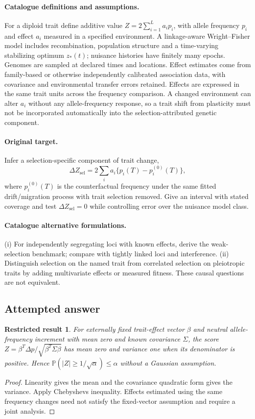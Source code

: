 \documentclass[11pt]{article}
\newcommand{\Prob}{\mathbb P}
\providecommand{\Prob}{\mathbb P}
\newtheorem{attemptresult}{Restricted result}[section]
\begin{document}
\paragraph{Catalogue definitions and assumptions.}
For a diploid trait define additive value $Z=2\sum_{i=1}^L a_i p_i$, with allele frequency $p_i$ and effect $a_i$ measured in a specified environment. A linkage-aware Wright--Fisher model includes recombination, population structure and a time-varying stabilizing optimum $z_*(t)$; nuisance histories have finitely many epochs. Genomes are sampled at declared times and locations. Effect estimates come from family-based or otherwise independently calibrated association data, with covariance and environmental transfer errors retained. Effects are expressed in the same trait units across the frequency comparison. A changed environment can alter $a_i$ without any allele-frequency response, so a trait shift from plasticity must not be incorporated automatically into the selection-attributed genetic component.
\paragraph{Original target.}
Infer a selection-specific component of trait change,
\[
 \Delta Z_{\mathrm{sel}}=
 2\sum_i a_i\{p_i(T)-p_i^{(0)}(T)\},
\]
where $p_i^{(0)}(T)$ is the counterfactual frequency under the same fitted drift/migration process with trait selection removed. Give an interval with stated coverage and test $\Delta Z_{\mathrm{sel}}=0$ while controlling error over the nuisance model class.
\paragraph{Catalogue alternative formulations.}
(i) For independently segregating loci with known effects, derive the weak-selection benchmark; compare with tightly linked loci and interference. (ii) Distinguish selection on the named trait from correlated selection on pleiotropic traits by adding multivariate effects or measured fitness. These causal questions are not equivalent.
\subsection{Attempted answer}
\begin{attemptresult}
For externally fixed trait-effect vector $\beta$ and neutral allele-frequency increment with mean zero and known covariance $\Sigma$, the score $Z=\beta^T\Delta p/\sqrt{\beta^T\Sigma\beta}$ has mean zero and variance one when its denominator is positive. Hence $\Prob(|Z|\geq1/\sqrt\alpha)\leq\alpha$ without a Gaussian assumption.
\end{attemptresult}
\begin{proof}
Linearity gives the mean and the covariance quadratic form gives the variance. Apply Chebyshev\textquotesingle s inequality. Effects estimated using the same frequency changes need not satisfy the fixed-vector assumption and require a joint analysis.
\end{proof}
\end{document}
